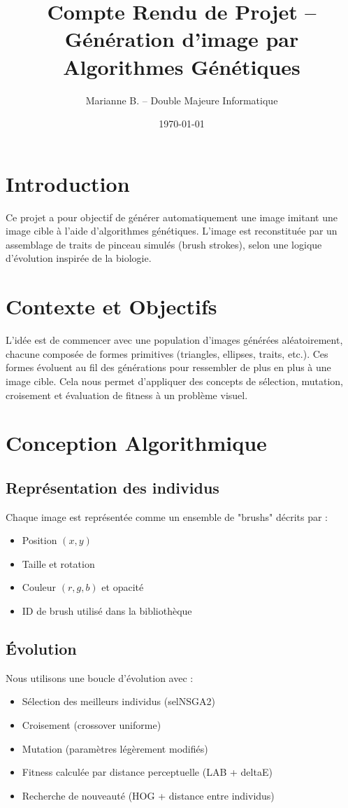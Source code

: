 \documentclass[11pt,a4paper]{article}
\title{\textbf{Compte Rendu de Projet -- Génération d'image par Algorithmes Génétiques}}
\author{Marianne B. -- Double Majeure Informatique}
\date{\today}
\begin{document}
\maketitle

\section{Introduction}
Ce projet a pour objectif de générer automatiquement une image imitant une image cible à l'aide d'algorithmes génétiques. L'image est reconstituée par un assemblage de traits de pinceau simulés (brush strokes), selon une logique d'évolution inspirée de la biologie.

\section{Contexte et Objectifs}
L'idée est de commencer avec une population d'images générées aléatoirement, chacune composée de formes primitives (triangles, ellipses, traits, etc.). Ces formes évoluent au fil des générations pour ressembler de plus en plus à une image cible. Cela nous permet d'appliquer des concepts de sélection, mutation, croisement et évaluation de fitness à un problème visuel.

\section{Conception Algorithmique}
\subsection{Représentation des individus}
Chaque image est représentée comme un ensemble de "brushs" décrits par :
\begin{itemize}
    \item Position $(x, y)$
    \item Taille et rotation
    \item Couleur $(r, g, b)$ et opacité
    \item ID de brush utilisé dans la bibliothèque
\end{itemize}

\subsection{Évolution}
Nous utilisons une boucle d'évolution avec :
\begin{itemize}
    \item Sélection des meilleurs individus (selNSGA2)
    \item Croisement (crossover uniforme)
    \item Mutation (paramètres légèrement modifiés)
    \item Fitness calculée par distance perceptuelle (LAB + deltaE)
    \item Recherche de nouveauté (HOG + distance entre individus)
\end{itemize}
\end{document}
